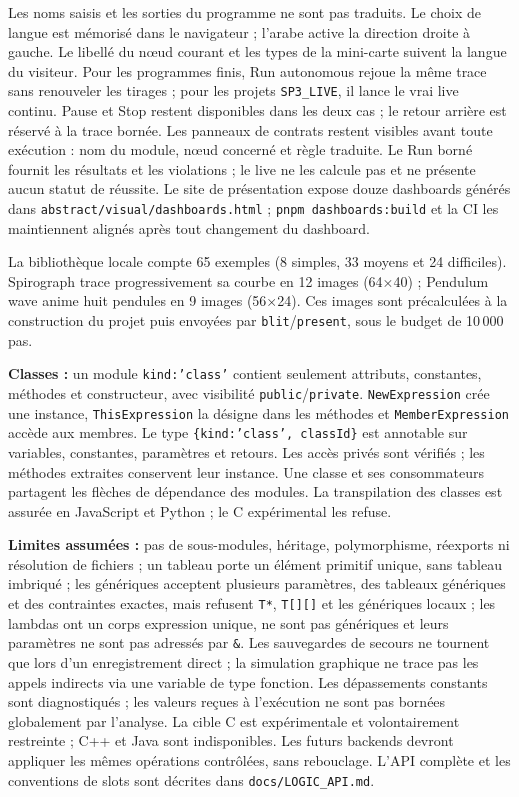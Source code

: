 \documentclass[11pt,a4paper]{article}
\newcommand{\code}[1]{\texttt{#1}}
\begin{document}
Les noms saisis et les sorties du programme ne sont pas traduits. Le choix de langue
est mémorisé dans le navigateur ; l'arabe active la direction droite à gauche. Le libellé
du nœud courant et les types de la mini-carte suivent la langue du visiteur.
Pour les programmes finis, Run autonomous rejoue la même trace sans renouveler
les tirages ; pour les projets \code{SP3\_LIVE}, il lance le vrai live continu.
Pause et Stop restent disponibles dans les deux cas ; le retour arrière est réservé
à la trace bornée. Les panneaux de contrats restent visibles avant toute exécution :
nom du module, nœud concerné et règle traduite. Le Run borné fournit les résultats
et les violations ; le live ne les calcule pas et ne présente aucun statut de réussite.
Le site de présentation expose douze dashboards générés dans \code{abstract/visual/dashboards.html} ;
\code{pnpm dashboards:build} et la CI les maintiennent alignés après tout changement du dashboard.

La bibliothèque locale compte 65 exemples (8 simples, 33 moyens et 24 difficiles).
Spirograph trace progressivement sa courbe en 12 images (64×40) ; Pendulum wave
anime huit pendules en 9 images (56×24). Ces images sont précalculées à la construction
du projet puis envoyées par \code{blit}/\code{present}, sous le budget de 10\,000 pas.

\textbf{Classes :} un module \code{kind:'class'} contient seulement attributs,
constantes, méthodes et constructeur, avec visibilité \code{public}/\code{private}.
\code{NewExpression} crée une instance, \code{ThisExpression} la désigne dans les
méthodes et \code{MemberExpression} accède aux membres. Le type
\code{\{kind:'class', classId\}} est annotable sur variables, constantes,
paramètres et retours. Les accès privés sont vérifiés ; les méthodes extraites
conservent leur instance. Une classe et ses consommateurs partagent les flèches
de dépendance des modules. La transpilation des classes est assurée en JavaScript et Python ; le C expérimental les refuse.

\textbf{Limites assumées :} pas de sous-modules, héritage, polymorphisme, réexports ni
résolution de fichiers ; un tableau porte un élément primitif unique, sans
tableau imbriqué ; les génériques acceptent plusieurs paramètres, des tableaux
génériques et des contraintes exactes, mais refusent \code{T*}, \code{T[][]} et
les génériques locaux ; les lambdas ont un corps expression unique, ne sont pas
génériques et leurs paramètres ne sont pas adressés par \code{\&}. Les
sauvegardes de secours ne tournent que lors d'un enregistrement direct ; la
simulation graphique ne trace pas les appels indirects via une variable de type
fonction. Les dépassements constants sont diagnostiqués ; les valeurs reçues à
l'exécution ne sont pas bornées globalement par l'analyse. La cible C est expérimentale et volontairement restreinte ; C++ et Java sont indisponibles. Les futurs backends devront appliquer les
mêmes opérations contrôlées, sans rebouclage. L'API complète et les conventions
de slots sont décrites dans \code{docs/LOGIC\_API.md}.
\end{document}
